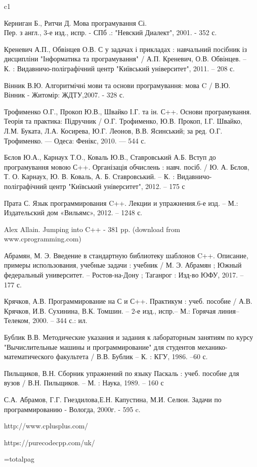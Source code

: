 \documentclass[a5paper,titlepage,openany,twoside,draft]{book_unv}%
\begin{document}
\begin{thebibliography} {c1}

 Керниган Б., Ритчи Д. Мова програмування Сі.\\ Пер. з англ., 3-е изд., испр. - СПб .: "Невский Диалект", 2001. - 352 с. 

 Креневич А.П., Обвінцев О.В. С у задачах і прикладах : навчальний посібник із дисципліни "Інформатика та програмування" / А.П. Креневич, О.В. Обвінцев. – К. : Видавничо-поліграфічний центр "Київський університет", 2011. – 208 с.

 Вінник В.Ю. Алгоритмічні мови та основи програмування: мова C / В.Ю. Вінник - Житомір: ЖДТУ,2007. - 328 с. 

Трофименко О.Г., Прокоп Ю.В., Швайко І.Г. та ін. С++. Основи програмування. Теорія та практика:
Підручник / О.Г. Трофименко, Ю.В. Прокоп, І.Г. Швайко, Л.М. Буката, Л.А. Косирева, Ю.Г. Леонов, В.В. Ясинський; за ред. О.Г. Трофименко. — Одеса: Фенікс, 2010. — 544 с.

Бєлов Ю.А., Карнаух Т.О., Коваль Ю.В., Ставровський А.Б. Вступ до програмування мовою С++. Організація обчислень :
навч. посіб. / Ю. А. Бєлов, Т. О. Карнаух, Ю. В. Коваль, А. Б. Ставровський. – 
К. : Видавничо-поліграфічний центр "Київський університет", 2012. – 175 с

Прата С. Язык программирования C++. Лекции и упражнения.6-е изд. – М.: Издательский дом «Вильямс», 2012. – 1248 с.

Alex Allain. Jumping into C++ - 381 pp. (download from www.cprogramming.com)

Абрамян, М. Э. Введение в стандартную библиотеку шаблонов C++. Описание, примеры использования, учебные задачи : учебник / М. Э. Абрамян ; Южный федеральный университет. – Ростов-на-Дону ; Таганрог : Изд-во ЮФУ, 2017. – 177 с.

Крячков, А.В. Программирование на С и С++. Практикум : учеб. пособие / А.В. Крячков, И.В. Сухинина, В.К. Томшин. – 2-е изд., испр.– М.: Горячая линия–Телеком, 2000. – 344 с.: ил.

Бублик В.В. Методические указания и задания к лабораторным занятиям по курсу "Вычислительные машины и программирование" для студентов механико-математического факультета / В.В. Бублик – К. : КГУ, 1986. –60 с.

Пильщиков, В.Н. Сборник упражнений по языку Паскаль : учеб. пособие для вузов / В.Н. Пильщиков. – М. : Наука, 1989. – 160 с

С.А. Абрамов, Г.Г. Гнездилова,Е.Н. Капустина, М.И. Селюн. Задачи по программированию - Вологда, 2000г. - 595 c.

http://www.cplusplus.com/

https://purecodecpp.com/uk/  

\end{thebibliography}

=totalpag
\end{document}
